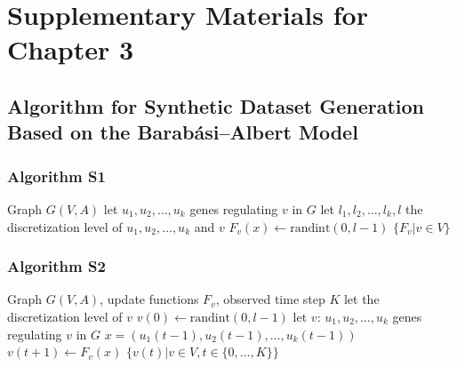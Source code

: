
\chapter{Supplementary Materials for Chapter 3} %

\label{AppendixB} %

\section{Algorithm for Synthetic Dataset Generation Based on the Barabási–Albert Model}

\subsection*{Algorithm S1}
\begin{algorithm}
\caption{RandomUpdateFunction}
\label{alg:random_update_function}
\begin{algorithmic}[1]
\Require Graph $G(V, A)$
    \State let $u_1, u_2, \dots, u_k$ genes regulating $v$ in $G$
    \State let $l_1, l_2, \dots, l_k, l$ the discretization level of $u_1, u_2, \dots, u_k$  and $v$
        \State $F_v(x) \gets \text{randint}(0, l - 1)$ 
    \EndFor
\EndFor
\State \Return $\{F_v | v \in V\}$
\end{algorithmic}
\end{algorithm}
\par

\subsection*{Algorithm S2}
\begin{algorithm}
\caption{RandomGeneExpression}
\label{alg:random_gene_exression}
\begin{algorithmic}[1]
\Require Graph $G(V, A)$, update functions $F_v$, observed time step $K$
    \State let the discretization level of $v$
    \State $v(0) \gets \text{randint}(0, l - 1)$
\EndFor
{}
        \State let $v$: $u_1, u_2, \dots, u_k$ genes regulating $v$ in $G$
        \State $x = (u_1(t-1), u_2(t-1), \dots, u_k(t-1))$
        \State $v(t+1) \gets F_v(x)$
    \EndFor
\EndFor
\State \Return $\{v(t) | v \in V, t \in \{0, \dots, K\}\}$
\end{algorithmic}
\end{algorithm}

